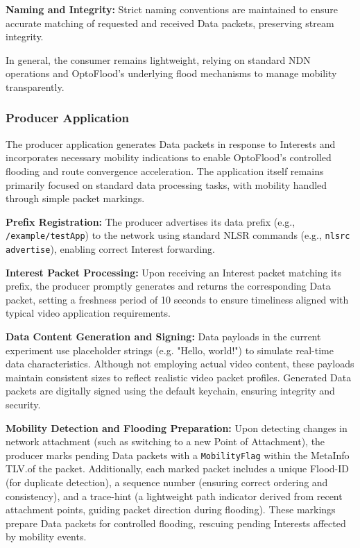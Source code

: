\documentclass[conference]{IEEEtran}
\begin{document}
\textbf{Naming and Integrity:}
Strict naming conventions are maintained to ensure accurate matching of requested and received Data packets, preserving stream integrity.

In general, the consumer remains lightweight, relying on standard NDN operations and OptoFlood’s underlying flood mechanisms to manage mobility transparently.

\subsubsection{Producer Application}

The producer application generates Data packets in response to Interests and incorporates necessary mobility indications to enable OptoFlood’s controlled flooding and route convergence acceleration. The application itself remains primarily focused on standard data processing tasks, with mobility handled through simple packet markings.

\textbf{Prefix Registration:}
The producer advertises its data prefix (e.g., \texttt{/example/testApp}) to the network using standard NLSR commands (e.g., \texttt{nlsrc advertise}), enabling correct Interest forwarding.

\textbf{Interest Packet Processing:}
Upon receiving an Interest packet matching its prefix, the producer promptly generates and returns the corresponding Data packet, setting a freshness period of 10 seconds to ensure timeliness aligned with typical video application requirements.

\textbf{Data Content Generation and Signing:}
Data payloads in the current experiment use placeholder strings (e.g. "Hello, world!") to simulate real-time data characteristics. Although not employing actual video content, these payloads maintain consistent sizes to reflect realistic video packet profiles. Generated Data packets are digitally signed using the default keychain, ensuring integrity and security.

\textbf{Mobility Detection and Flooding Preparation:}
Upon detecting changes in network attachment (such as switching to a new Point of Attachment), the producer marks pending Data packets with a \texttt{MobilityFlag} within the MetaInfo TLV.of the packet. Additionally, each marked packet includes a unique Flood-ID (for duplicate detection), a sequence number (ensuring correct ordering and consistency), and a trace-hint (a lightweight path indicator derived from recent attachment points, guiding packet direction during flooding). These markings prepare Data packets for controlled flooding, rescuing pending Interests affected by mobility events.
\end{document}
